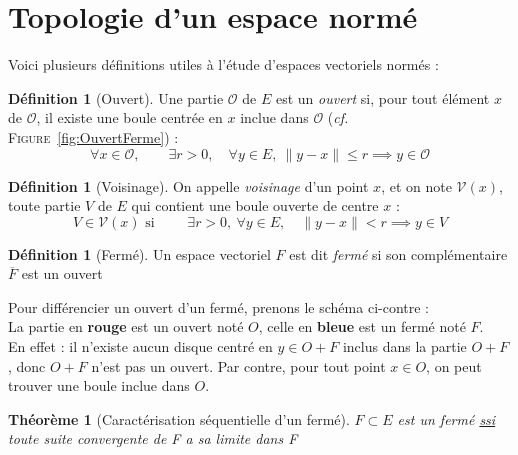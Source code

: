 \documentclass[11pt,a4paper]{report}
\newtheorem{itheorem}[theorem]{Théorème}
\theoremstyle{definition}
\newtheorem{dfn}[theorem]{Définition}
\begin{document}
\section{Topologie d'un espace normé} %
\label{sec:topologie}
Voici plusieurs définitions utiles à l'étude d'espaces vectoriels normés :
\begin{dfn}[Ouvert]
Une partie $\mathcal{O}$ de $E$ est un \emph{ouvert} si, pour tout élément $x$ de $\mathcal{O}$, il existe une boule centrée en $x$ inclue dans $\mathcal{O}$ (\textit{cf. }\textsc{Figure}~\ref{fig:OuvertFerme}) : 
\begin{equation}
\forall x\in \mathcal{O},\qquad \exists r > 0, \quad \forall y\in E,\: \| y - x \| \le r \implies y \in \mathcal{O}
\end{equation}
\end{dfn}
\begin{dfn}[Voisinage]
     On appelle \emph{voisinage} d'un point $x$, et on note $\mathscr{V}(x)$, toute partie $V$ de $E$ qui contient une boule ouverte de centre $x$ : 
     \begin{equation}
     V\in \mathscr{V} (x) \text{ si }\qquad\exists r > 0,\: \forall y \in E, \quad \| y-x \| < r \implies y \in V
     \end{equation}
\end{dfn}
\begin{dfn}[Fermé]
Un espace vectoriel $F$ est dit \emph{fermé} si son complémentaire $\overline{F}$ est un ouvert
\end{dfn}
%
\begin{minipage}{0.5\textwidth}
Pour différencier un ouvert d'un fermé, prenons le schéma ci-contre : \\
La partie en \textbf{rouge} est un ouvert noté $O$, celle en \textbf{bleue} est un fermé noté $F$.\\
En effet : il n'existe aucun disque centré en $y \in O+F$ inclus dans la partie $O+F$, donc $O+F$ n'est pas un ouvert. Par contre, pour tout point $x \in O$, on peut trouver une boule inclue dans $O$.
\end{minipage}\hspace{6pt}
\begin{minipage}{0.4\textwidth}
\begin{center}
\end{center}
\label{fig:OuvertFerme}
\end{minipage}
%
\begin{itheorem}[Caractérisation séquentielle d'un fermé]
$F\subset E$ est un \emph{fermé} \uline{\emph{ssi}} toute suite convergente de F a sa limite dans F
\end{itheorem}
\end{document}
